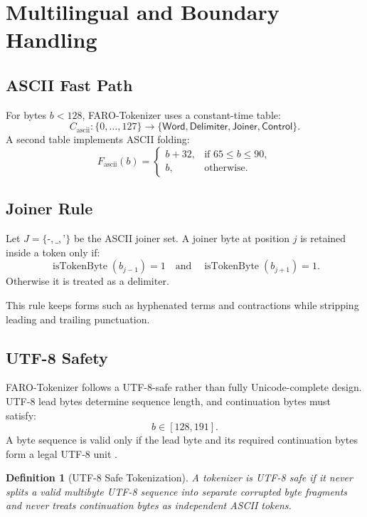 \documentclass[11pt,a4paper]{article}
\newtheorem{definition}{Definition}
\begin{document}
\section{Multilingual and Boundary Handling}

\subsection{ASCII Fast Path}

For bytes \(b<128\), FARO-Tokenizer uses a constant-time table:
\[
C_{\text{ascii}}:\{0,\dots,127\}\rightarrow\{\textsf{Word},\textsf{Delimiter},\textsf{Joiner},\textsf{Control}\}.
\]
A second table implements ASCII folding:
\[
F_{\text{ascii}}(b)=
\begin{cases}
b+32, & \text{if }65\le b\le 90,\\
b, & \text{otherwise}.
\end{cases}
\]

\subsection{Joiner Rule}

Let \(J=\{\texttt{-},\texttt{\_},\texttt{'}\}\) be the ASCII joiner set. A joiner byte at position \(j\) is retained inside a token only if:
\[
\operatorname{isTokenByte}(b_{j-1})=1
\quad\text{and}\quad
\operatorname{isTokenByte}(b_{j+1})=1.
\]
Otherwise it is treated as a delimiter.

This rule keeps forms such as hyphenated terms and contractions while stripping leading and trailing punctuation.

\subsection{UTF-8 Safety}

FARO-Tokenizer follows a UTF-8-safe rather than fully Unicode-complete design. UTF-8 lead bytes determine sequence length, and continuation bytes must satisfy:
\[
b \in [128,191].
\]
A byte sequence is valid only if the lead byte and its required continuation bytes form a legal UTF-8 unit \cite{Yergeau2003UTF8}.

\begin{definition}[UTF-8 Safe Tokenization]
A tokenizer is UTF-8 safe if it never splits a valid multibyte UTF-8 sequence into separate corrupted byte fragments and never treats continuation bytes as independent ASCII tokens.
\end{definition}
\end{document}
